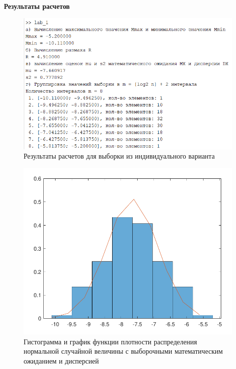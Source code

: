 \documentclass{bmstu}
\begin{document}









\textbf{\LARGE{Результаты расчетов}}

\begin{figure}[H]
	\centering
	\includegraphics[width=\textwidth]{img/res.png}
	\caption{Результаты расчетов для выборки из индивидуального варианта}
\end{figure}

\begin{figure}[H]
	\centering
	\includegraphics[width=\textwidth]{img/graph1.pdf}
	\caption{Гистограмма и график функции плотности распределения нормальной случайной величины с выборочными математическим ожиданием и дисперсией}
\end{figure}
\end{document}
